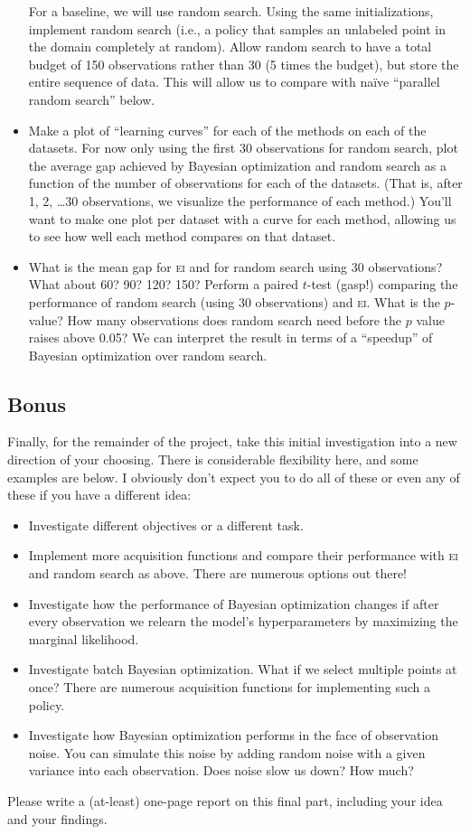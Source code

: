 \documentclass{article}
\newcommand{\acro}[1]{\textsc{\MakeLowercase{#1}}}
\begin{document}
\begin{itemize}
  For a baseline, we will use random search. Using the same initializations,
  implement random search (i.e., a policy that samples an unlabeled point in the
  domain completely at random). Allow random search to have a total budget of
  150 observations rather than 30 (5 times the budget), but store the entire
  sequence of data. This will allow us to compare with na\"ive ``parallel random
  search'' below.
\item
  Make a plot of ``learning curves'' for each of the methods on each of the
  datasets. For now only using the first 30 observations for random search, plot
  the average gap achieved by Bayesian optimization and random search as a
  function of the number of observations for each of the datasets. (That is,
  after 1, 2, \dots 30 observations, we visualize the performance of each
  method.) You'll want to make one plot per dataset with a curve for each
  method, allowing us to see how well each method compares on that dataset.
\item
  What is the mean gap for \acro{EI} and for random search using 30
  observations?  What about 60? 90? 120? 150?  Perform a paired $t$-test (gasp!)
  comparing the performance of random search (using 30 observations) and
  \acro{EI}. What is the $p$-value? How many observations does random search
  need before the $p$ value raises above 0.05? We can interpret the result in
  terms of a ``speedup'' of Bayesian optimization over random search.
\end{itemize}

\subsection*{Bonus}

Finally, for the remainder of the project, take this initial investigation into
a new direction of your choosing. There is considerable flexibility here, and some
examples are below. I obviously don't expect you to do all of these or even any
of these if you have a different idea:
\begin{itemize}
\item
  Investigate different objectives or a different task.
\item
  Implement more acquisition functions and compare their performance with
  \acro{EI} and random search as above. There are numerous options out there!
\item
  Investigate how the performance of Bayesian optimization changes if after
  every observation we relearn the model's hyperparameters by maximizing
  the marginal likelihood.
\item
  Investigate batch Bayesian optimization. What if we select multiple points
  at once? There are numerous acquisition functions for implementing such a policy.
\item
  Investigate how Bayesian optimization performs in the face of observation
  noise.  You can simulate this noise by adding random noise with a given
  variance into each observation. Does noise slow us down? How much?
\end{itemize}

Please write a (at-least) one-page report on this final part,
including your idea and your findings.
\end{document}
